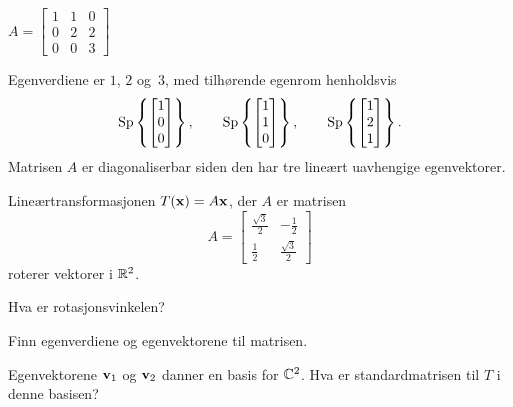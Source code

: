 \begin{losning}
\begin{punkt}
$
A =
\begin{bmatrix}
1 & 1 & 0 \\
0 & 2 & 2 \\
0 & 0 & 3
\end{bmatrix}
$
\end{punkt}

\begin{punkt}
Egenverdiene er $1$, $2$ og~$3$, med tilhørende egenrom henholdsvis
\[
\operatorname{Sp} \left\{ \begin{bmatrix} 1 \\ 0 \\ 0 \end{bmatrix} \right\},\qquad
\operatorname{Sp} \left\{ \begin{bmatrix} 1 \\ 1 \\ 0 \end{bmatrix} \right\},\qquad
\operatorname{Sp} \left\{ \begin{bmatrix} 1 \\ 2 \\ 1 \end{bmatrix} \right\}.
\]
Matrisen $A$ er diagonaliserbar siden den har tre lineært uavhengige
egenvektorer.
\end{punkt}
\end{losning}



\begin{oppgave}
Lineærtransformasjonen $T(\mathbf{x})=A\mathbf{x}$, der $A$ er matrisen
\[
A=
\begin{bmatrix}
\frac{\sqrt{3}}{2} & -\frac{1}{2} \\ \frac{1}{2} & \frac{\sqrt{3}}{2}
\end{bmatrix}
\]
roterer vektorer i $\mathbb{R}^2$. 
\begin{punkt}
Hva er rotasjonsvinkelen?
\end{punkt}
\begin{punkt}
Finn egenverdiene og egenvektorene til matrisen. 
\end{punkt}
\begin{punkt}
Egenvektorene $\mathbf{v}_1$ og $\mathbf{v}_2$ danner en basis for $\mathbb{C}^2$. Hva er standardmatrisen til $T$ i denne basisen?
\end{punkt}

\end{oppgave}



